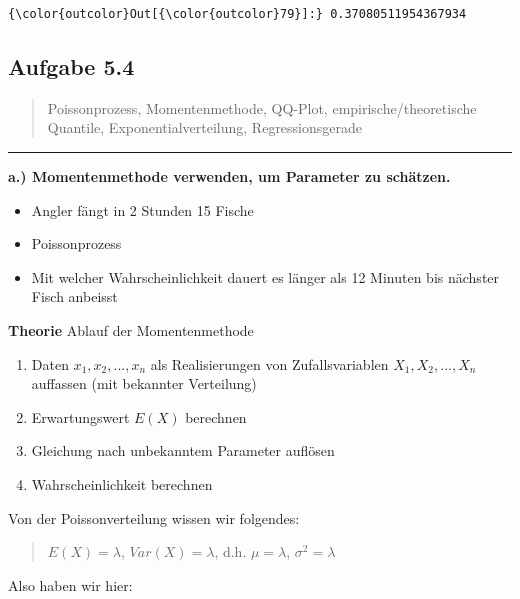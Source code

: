\documentclass[11pt]{article}
\providecommand{\tightlist}{%
      \setlength{\itemsep}{0pt}\setlength{\parskip}{0pt}}
\begin{document}
\begin{Verbatim}[commandchars=\\\{\}]
{\color{outcolor}Out[{\color{outcolor}79}]:} 0.37080511954367934
\end{Verbatim}
            
    \subsection{Aufgabe 5.4}\label{aufgabe-5.4}

\begin{quote}
Poissonprozess, Momentenmethode, QQ-Plot, empirische/theoretische
Quantile, Exponentialverteilung, Regressionsgerade
\end{quote}

\begin{center}\rule{0.5\linewidth}{\linethickness}\end{center}

\textbf{a.) Momentenmethode verwenden, um Parameter zu schätzen.}

\begin{itemize}
\tightlist
\item
  Angler fängt in 2 Stunden 15 Fische
\item
  Poissonprozess
\item
  Mit welcher Wahrscheinlichkeit dauert es länger als 12 Minuten bis
  nächster Fisch anbeisst
\end{itemize}

\textbf{Theorie} Ablauf der Momentenmethode

\begin{enumerate}
\def\labelenumi{\arabic{enumi}.}
\tightlist
\item
  Daten \(x_1, x_2, ..., x_n\) als Realisierungen von Zufallsvariablen
  \(X_1, X_2, ..., X_n\) auffassen (mit bekannter Verteilung)
\item
  Erwartungswert \(E(X)\) berechnen
\item
  Gleichung nach unbekanntem Parameter auflösen
\item
  Wahrscheinlichkeit berechnen
\end{enumerate}

Von der Poissonverteilung wissen wir folgendes:

\begin{quote}
\(E(X) = \lambda\), \(Var(X) = \lambda\), d.h. \(\mu = \lambda\),
\(\sigma^2 = \lambda\)
\end{quote}

Also haben wir hier:
\end{document}
